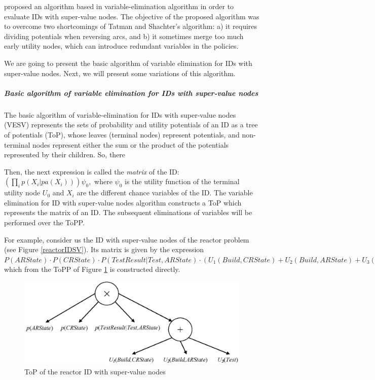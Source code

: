 \cite{luque04} proposed an algorithm based in variable-elimination
algorithm in order to evaluate IDs with super-value nodes. The
objective of the proposed algorithm was to overcome two shortcomings
of Tatman and Shachter's algorithm: a) it requires dividing
potentials when reversing arcs, and b) it sometimes merge too much
early utility nodes, which can introduce redundant variables in the
policies.

We are going to present the basic algorithm of variable elimination for IDs
with super-value nodes. Next, we will present some variations of this
algorithm.

\subparagraph{Basic algorithm of variable elimination for IDs with
super-value nodes}

The basic algorithm of variable-elimination for IDs with super-value nodes
(VESV) represents the sets of probability and utility potentials of an ID as
a tree of potentials (ToP), whose leaves (terminal nodes) represent
potentials, and non-terminal nodes represent either the sum or the product
of the potentials represented by their children. So, there

Then, the next expression is called the \textit{matrix} of the ID: $\left(
\prod_{i}p(X_{i}|pa(X_{i}))\right) \psi _{0},$ where $\psi _{0}$ is the
utility function of the terminal utility node $U_{0}$ and $X_{i}$ are the
different chance variables of the ID. The variable elimination for ID with
super-value nodes algorithm constructs a ToP which represents the matrix of
an ID. The subsequent eliminations of variables will be performed over the
ToPP.

For example, consider us the ID with super-value nodes of the reactor
problem (see Figure \ref{reactorIDSV}). Its matrix is given by the
expression $P(ARState)\cdot P(CRState)\cdot P(TestResult|Test,ARState)\cdot
(U_{1}(Build,CRState)+U_{2}(Build,ARState)+U_{3}(Test)),$ which from the
ToPP of Figure \ref{fig:ToPreactorIDSV} is constructed directly.

\begin{figure}[h]
\begin{center}
\includegraphics[scale=0.6]{./ID/fig/ToPreactorIDSV} \vspace{-0.5cm}
\end{center}
\caption{ToP of the reactor ID with super-value nodes}
\label{fig:ToPreactorIDSV}
\end{figure}
\bigskip

